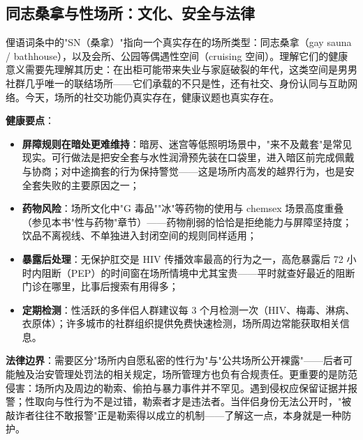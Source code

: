 \subsection{同志桑拿与性场所：文化、安全与法律}

俚语词条中的"SN（桑拿）"指向一个真实存在的场所类型：同志桑拿（gay sauna / bathhouse），以及会所、公园等偶遇性空间（cruising 空间）。理解它们的健康意义需要先理解其历史：在出柜可能带来失业与家庭破裂的年代，这类空间是男男社群几乎唯一的联结场所——它们承载的不只是性，还有社交、身份认同与互助网络。今天，场所的社交功能仍真实存在，健康议题也真实存在。

\textbf{健康要点}：
\begin{itemize}
\item \textbf{屏障规则在暗处更难维持}：暗房、迷宫等低照明场景中，"来不及戴套"是常见现实。可行做法是把安全套与水性润滑预先装在口袋里，进入暗区前完成佩戴与协商；对中途摘套的行为保持警觉——这是场所内高发的越界行为，也是安全套失败的主要原因之一；
\item \textbf{药物风险}：场所文化中"G 毒品""冰"等药物的使用与 chemsex 场景高度重叠（参见本书"性与药物"章节）——药物削弱的恰恰是拒绝能力与屏障坚持度；饮品不离视线、不单独进入封闭空间的规则同样适用；
\item \textbf{暴露后处理}：无保护肛交是 HIV 传播效率最高的行为之一，高危暴露后 72 小时内阻断（PEP）的时间窗在场所情境中尤其宝贵——平时就查好最近的阻断门诊在哪里，比事后搜索有用得多；
\item \textbf{定期检测}：性活跃的多伴侣人群建议每 3 个月检测一次（HIV、梅毒、淋病、衣原体）；许多城市的社群组织提供免费快速检测，场所周边常能获取相关信息。
\end{itemize}

\textbf{法律边界}：需要区分"场所内自愿私密的性行为"与"公共场所公开裸露"——后者可能触及治安管理处罚法的相关规定，场所管理方也负有合规责任。更重要的是防范侵害：场所内及周边的勒索、偷拍与暴力事件并不罕见。遇到侵权应保留证据并报警；性取向与性行为不是过错，勒索者才是违法者。当伴侣身份无法公开时，"被敲诈者往往不敢报警"正是勒索得以成立的机制——了解这一点，本身就是一种防护。
